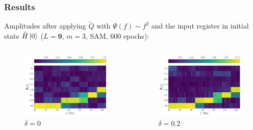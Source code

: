 \documentclass{beamer}
\begin{document}
\begin{frame}
\frametitle{Results}
Amplitudes after applying $\tilde{Q}$ with $\Psi(f) \sim f^2$ and the input register in initial state $\hat{H} \ket{0}$ ($L=\boldsymbol{9}$, $m=3$, SAM, 600 epochs):
\begin{columns}
\begin{column}{0.5\textwidth}
\begin{figure}
\centering
\includegraphics[width=\textwidth]{im/Q_amp_quadratic_0.0_H.pdf}
\caption{$\delta =0$}
\end{figure}
\end{column}
\begin{column}{0.5\textwidth}
\begin{figure}
\centering
\includegraphics[width=\textwidth]{im/Q_amp_quadratic_0.2_H.pdf}
\caption{$\delta =0.2$}
\end{figure} 
\end{column}
\end{columns}
\end{frame}
\end{document}

